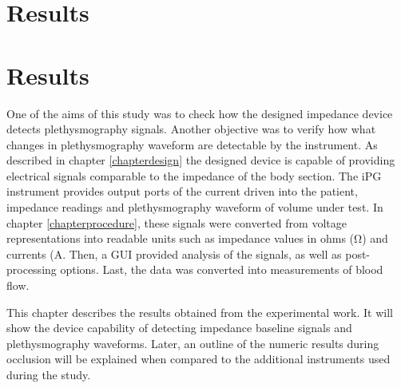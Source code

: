 
\chapter{Results}  %
\label{chapterresults}

\ifpdf
    \graphicspath{{Chapter5/Figs/Raster/}{Chapter5/Figs/PDF/}{Chapter5/Figs/}}
\else
    \graphicspath{{Chapter5/Figs/Vector/}{Chapter5/Figs/}}
\fi


\chapter{Results}  %
\label{chapterresults}

\ifpdf
\graphicspath{{Chapter5/Figs/Raster/}{Chapter5/Figs/PDF/}{Chapter5/Figs/}}
\else
\graphicspath{{Chapter5/Figs/Vector/}{Chapter5/Figs/}}
\fi

One of the aims of this study was to check how the designed impedance device detects plethysmography signals. Another objective was to verify how what changes in plethysmography waveform are detectable by the instrument. As described in chapter \ref{chapterdesign} the designed device is capable of providing electrical signals comparable to the impedance of the body section. The iPG instrument provides output ports of the current driven into the patient, impedance readings and plethysmography waveform of volume under test. In chapter \ref{chapterprocedure}, these signals were converted from voltage representations into readable units such as impedance values in ohms (\si{\ohm}) and currents (\si{\ampere}. Then, a GUI provided analysis of the signals, as well as post-processing options. Last, the data was converted into measurements of blood flow.


This chapter describes the results obtained from the experimental work. It will show the device capability of detecting impedance baseline signals and plethysmography waveforms. Later, an outline of the numeric results during occlusion will be explained when compared to the additional instruments used during the study. 


